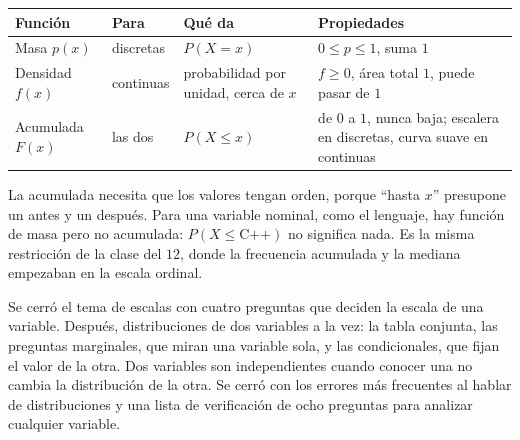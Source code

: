 \documentclass[11pt,letterpaper]{article}
\begin{document}
\begin{center}
\small
\begin{tabular}{l>{\raggedright\arraybackslash}p{2.2cm}%
                 >{\raggedright\arraybackslash}p{3.6cm}%
                 >{\raggedright\arraybackslash}p{4.8cm}}
    \toprule
    \textbf{Función} & \textbf{Para} & \textbf{Qué da}
    & \textbf{Propiedades} \\
    \midrule
    Masa $p(x)$ & discretas & $P(X = x)$
                & $0 \le p \le 1$, suma $1$ \\
    \addlinespace
    Densidad $f(x)$ & continuas & probabilidad por unidad, cerca de $x$
                    & $f \ge 0$, área total $1$, puede pasar de $1$ \\
    \addlinespace
    Acumulada $F(x)$ & las dos & $P(X \le x)$
                     & de $0$ a $1$, nunca baja; escalera en
                       discretas, curva suave en continuas \\
    \bottomrule
\end{tabular}
\end{center}

\begin{ojo}
    La acumulada necesita que los valores tengan orden, porque
    ``hasta $x$'' presupone un antes y un después. Para una variable
    nominal, como el lenguaje, hay función de masa pero no acumulada:
    $P(X \le \text{C++})$ no significa nada. Es la misma restricción
    de la clase del $12$, donde la frecuencia acumulada y la mediana
    empezaban en la escala ordinal.
\end{ojo}


\newpage



\begin{quick_sum}
    Se cerró el tema de escalas con cuatro preguntas que deciden la
    escala de una variable. Después, distribuciones de dos variables a
    la vez: la tabla conjunta, las preguntas marginales, que miran una
    variable sola, y las condicionales, que fijan el valor de la otra.
    Dos variables son independientes cuando conocer una no cambia la
    distribución de la otra. Se cerró con los errores más frecuentes al
    hablar de distribuciones y una lista de verificación de ocho
    preguntas para analizar cualquier variable.
\end{quick_sum}
\end{document}
